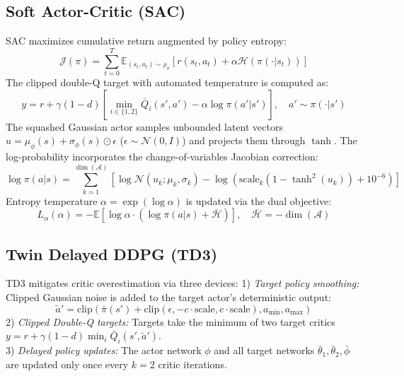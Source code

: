 \documentclass[10pt,journal,compsoc]{IEEEtran}
\begin{document}
\subsection{Soft Actor-Critic (SAC)}
SAC maximizes cumulative return augmented by policy entropy:
\begin{equation}
\mathcal{J}(\pi) = \sum_{t=0}^T \mathbb{E}_{(s_t, a_t) \sim \rho_\pi} \left[ r(s_t, a_t) + \alpha \mathcal{H}(\pi(\cdot|s_t)) \right]
\end{equation}
The clipped double-Q target with automated temperature is computed as:
\begin{equation}
y = r + \gamma (1 - d) \left[ \min_{i \in \{1, 2\}} \bar{Q}_i(s', a') - \alpha \log \pi(a'|s') \right], \quad a' \sim \pi(\cdot|s')
\end{equation}
The squashed Gaussian actor samples unbounded latent vectors $u = \mu_\phi(s) + \sigma_\phi(s) \odot \epsilon$ ($\epsilon \sim \mathcal{N}(0, I)$) and projects them through $\tanh$. The log-probability incorporates the change-of-variables Jacobian correction:
\begin{equation}
\log \pi(a|s) = \sum_{k=1}^{\dim(\mathcal{A})} \left[ \log \mathcal{N}(u_k; \mu_k, \sigma_k) - \log \left( \text{scale}_k (1 - \tanh^2(u_k)) + 10^{-6} \right) \right]
\end{equation}
Entropy temperature $\alpha = \exp(\log \alpha)$ is updated via the dual objective:
\begin{equation}
L_\alpha(\alpha) = -\mathbb{E} \left[ \log \alpha \cdot (\log \pi(a|s) + \bar{\mathcal{H}}) \right], \quad \bar{\mathcal{H}} = -\dim(\mathcal{A})
\end{equation}

\subsection{Twin Delayed DDPG (TD3)}
TD3 mitigates critic overestimation via three devices:
1) \textit{Target policy smoothing:} Clipped Gaussian noise is added to the target actor's deterministic output:
\begin{equation}
\tilde{a}' = \text{clip}\left( \bar{\pi}(s') + \text{clip}(\epsilon, -c \cdot \text{scale}, c \cdot \text{scale}), a_{\min}, a_{\max} \right)
\end{equation}
2) \textit{Clipped Double-Q targets:} Targets take the minimum of two target critics $y = r + \gamma (1 - d) \min_i \bar{Q}_i(s', \tilde{a}')$.\\
3) \textit{Delayed policy updates:} The actor network $\phi$ and all target networks $\bar{\theta}_1, \bar{\theta}_2, \bar{\phi}$ are updated only once every $k=2$ critic iterations.
\end{document}
